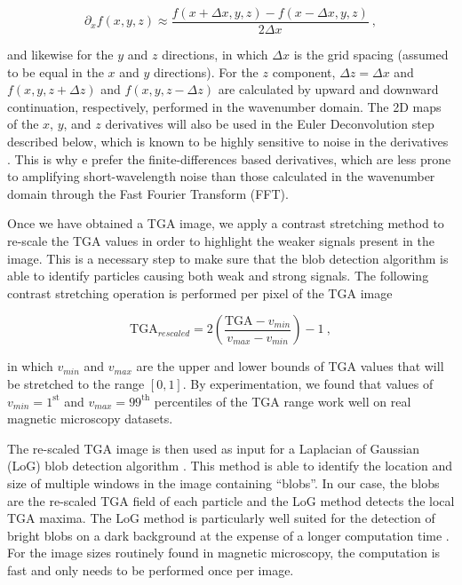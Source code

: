 \begin{equation}
\partial_x f(x, y, z) \approx
\dfrac{f(x + \Delta x, y, z) - f(x - \Delta x, y, z)}{2 \Delta x}
\ ,
\end{equation}

\noindent
and likewise for the $y$ and $z$ directions, in which $\Delta x$ is the grid
spacing (assumed to be equal in the $x$ and $y$ directions). For the $z$
component, $\Delta z = \Delta x$ and $f(x, y, z + \Delta z)$ and
$f(x, y, z - \Delta z)$ are calculated by upward and downward continuation,
respectively, performed in the wavenumber domain. The 2D maps of the $x$, $y$,
and $z$ derivatives will also be used in the Euler Deconvolution step described
below, which is known to be highly sensitive to noise in the derivatives
\citep{Saleh2012Applying}. This is why e prefer the finite-differences based
derivatives, which are less prone to amplifying short-wavelength noise than
those calculated in the wavenumber domain through the Fast Fourier Transform
(FFT).

Once we have obtained a TGA image, we apply a contrast stretching method to
re-scale the TGA values in order to highlight the weaker signals present in the
image. This is a necessary step to make sure that the blob detection algorithm
is able to identify particles causing both weak and strong signals. The
following contrast stretching operation is performed per pixel of the TGA image

\begin{equation}
\text{TGA}_{rescaled} =
2\left(\dfrac{\text{TGA} - v_{min}}{v_{max} - v_{min}}\right) - 1
\ ,
\end{equation}

\noindent
in which $v_{min}$ and $v_{max}$ are the upper and lower bounds of TGA values
that will be stretched to the range $[0, 1]$. By experimentation, we found
that values of $v_{min} = 1^\text{st}$ and $v_{max} = 99^\text{th}$
percentiles of the TGA range work well on real magnetic microscopy datasets.

The re-scaled TGA image is then used as input for a Laplacian of Gaussian (LoG)
blob detection algorithm \citep{Kong2013}. This method is able to identify the
location and size of multiple windows in the image containing ``blobs''. In our
case, the blobs are the re-scaled TGA field of each particle and the LoG method
detects the local TGA maxima. The LoG method is particularly well suited for
the detection of bright blobs on a dark background at the expense of a longer
computation time \citep{Han2016}. For the image sizes routinely found in
magnetic microscopy, the computation is fast and only needs to be performed
once per image.

